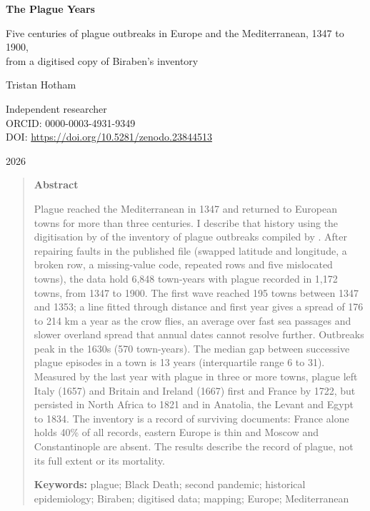 \documentclass[11pt,a4paper]{article}
\begin{document}
\begin{center}
{\Large\bfseries The Plague Years\par}
\vspace{0.4em}
{\large Five centuries of plague outbreaks in Europe and the Mediterranean, 1347 to 1900,\\from a digitised copy of Biraben's inventory\par}
\vspace{1.2em}
{\large Tristan Hotham\par}
\vspace{0.3em}
{\small Independent researcher\\
ORCID: 0000-0003-4931-9349\\
DOI: \href{https://doi.org/10.5281/zenodo.23844513}{https://doi.org/10.5281/zenodo.23844513}\par}
\vspace{0.8em}
2026
\end{center}

\begin{quote}
\small
\begin{center}\textbf{Abstract}\end{center}
Plague reached the Mediterranean in 1347 and returned to European towns for more than three centuries. I describe that history using the digitisation by \citet{buntgen2012} of the inventory of plague outbreaks compiled by \citet{biraben1975}. After repairing faults in the published file (swapped latitude and longitude, a broken row, a missing-value code, repeated rows and five mislocated towns), the data hold 6,848 town-years with plague recorded in 1,172 towns, from 1347 to 1900. The first wave reached 195 towns between 1347 and 1353; a line fitted through distance and first year gives a spread of 176 to 214 km a year as the crow flies, an average over fast sea passages and slower overland spread that annual dates cannot resolve further. Outbreaks peak in the 1630s (570 town-years). The median gap between successive plague episodes in a town is 13 years (interquartile range 6 to 31). Measured by the last year with plague in three or more towns, plague left Italy (1657) and Britain and Ireland (1667) first and France by 1722, but persisted in North Africa to 1821 and in Anatolia, the Levant and Egypt to 1834. The inventory is a record of surviving documents: France alone holds 40\% of all records, eastern Europe is thin and Moscow and Constantinople are absent. The results describe the record of plague, not its full extent or its mortality.

\textbf{Keywords:} plague; Black Death; second pandemic; historical epidemiology; Biraben; digitised data; mapping; Europe; Mediterranean
\end{quote}
\end{document}
